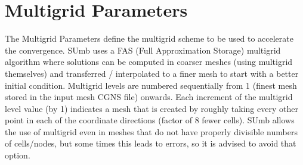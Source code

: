 \documentclass[12pt,epsf,colordvi]{article}
\begin{document}
\section{Multigrid  Parameters} \label{sec:mg}
%
The Multigrid Parameters define the multigrid scheme to be used to accelerate the convergence. SUmb uses a FAS (Full Approximation Storage) multigrid algorithm where solutions can be computed in coarser meshes (using multigrid themselves) and transferred / interpolated to a finer mesh to start with a better initial condition. Multigrid levels are numbered sequentially from 1 (finest mesh stored in the input mesh CGNS file) onwards. Each increment of the multigrid level value (by 1) indicates a mesh that is created by roughly taking every other point in each of the coordinate directions (factor of 8 fewer cells). SUmb allows the use of multigrid even in meshes that do not have properly divisible numbers of cells/nodes, but some times this leads to errors, so it is advised to avoid that option.
% 
\end{document}

